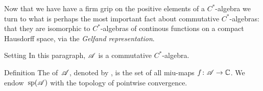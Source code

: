 \documentclass[main]{subfiles}
\begin{document}
\begin{parsec}%
\begin{point}%
Now that we have have a firm grip
on the positive elements of a $C^*$-algebra
we turn to what is perhaps the most important
fact about commutative $C^*$-algebras:
that they are isomorphic to $C^*$-algebras
of continous functions on a compact Hausdorff space,
via the \emph{Gelfand representation}.

\end{point}
\begin{point}{Setting}%
In this paragraph,
$\mathscr{A}$ is a commutative $C^*$-algebra.
\end{point}
\begin{point}{Definition}%
The  of~$\mathscr{A}$,
denoted by \Define{$\spec(\scrA)$},
is the set of all miu-maps $f\colon \mathscr{A}\to \mathbb{C}$.
We endow~$\spec(\scrA)$
with the topology of pointwise convergence.


\end{point}
\end{parsec}
\end{document}
